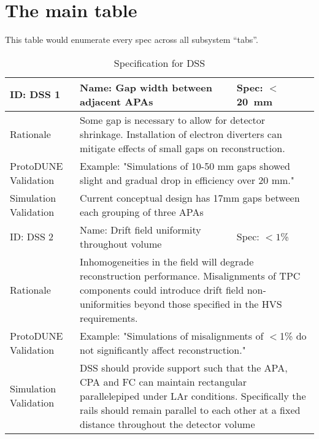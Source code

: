 \documentclass{article}
\begin{document}
\section{The main table}

This table would enumerate every spec across all subsystem ``tabs''.


\begin{table}[htp]
  \caption{Specification for DSS}
  \centering
  \begin{tabular}{ |l|p{}|p{}| }
    \hline
        

    \rowcolor{dunetablecolor}
ID:  DSS 1   & Name: Gap width between adjacent APAs  & Spec:  $<$\SI{20}{\milli\meter} \\
    \hline
    Rationale &  \multicolumn{2}{p{0.7\textwidth}|}{ Some gap is necessary to allow for detector shrinkage. Installation of electron diverters can mitigate effects of small gaps on reconstruction. } \\
    \hline
ProtoDUNE Validation & \multicolumn{2}{p{0.7\textwidth}|}{ Example: "Simulations of 10-50 mm gaps showed slight and gradual drop in efficiency over 20 mm." } \\
    \hline
Simulation Validation & \multicolumn{2}{p{0.7\textwidth}|}{ Current conceptual design has 17mm gaps between each grouping of three APAs } \\
        \hline
   

    \rowcolor{dunetablecolor}
ID:  DSS 2   & Name: Drift field uniformity throughout volume  & Spec:  $<1$\%  \\
    \hline
    Rationale &  \multicolumn{2}{p{0.7\textwidth}|}{ Inhomogeneities in the field will degrade reconstruction performance. Misalignments of TPC components could introduce drift field non-uniformities beyond those specified in the HVS requirements. } \\
    \hline
ProtoDUNE Validation & \multicolumn{2}{p{0.7\textwidth}|}{ Example: "Simulations of misalignments of $<$1\% do not significantly affect reconstruction." } \\
    \hline
Simulation Validation & \multicolumn{2}{p{0.7\textwidth}|}{ DSS should provide support such that the APA, CPA and FC can maintain rectangular parallelepiped under LAr conditions. Specifically the rails should remain parallel to each other at a fixed distance throughout the detector volume } \\
        \hline
   


\end{tabular}
\end{table}
\end{document}
